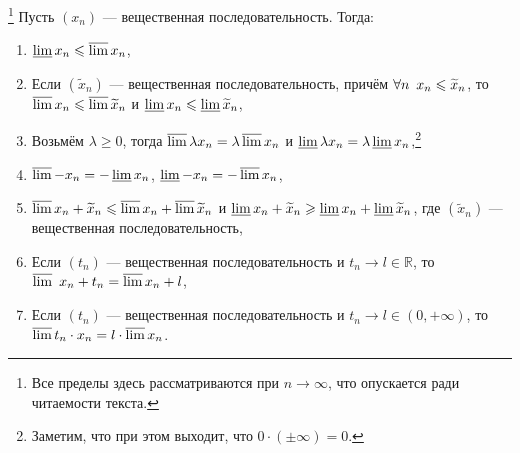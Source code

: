 \begin{theorem}\footnote{Все пределы здесь рассматриваются при \(n \to \infty\), что опускается ради читаемости текста.}
	Пусть \((x_n)\) --- вещественная последовательность. Тогда:
	\begin{enumerate}
		\item \(\varliminf x_n \leqslant \varlimsup x_n\),
		\item Если \((\widetilde{x}_n)\) --- вещественная последовательность, причём \(\forall n \enskip x_n \leqslant \widetilde{x}_n\), то \(\varlimsup x_n \leqslant \varlimsup \widetilde{x}_n\) и \(\varliminf x_n \leqslant \varliminf \widetilde{x}_n\),
		\item Возьмём \(\lambda \geqslant 0\), тогда \(\varlimsup \lambda x_n = \lambda \varlimsup x_n\) и \(\varliminf \lambda x_n = \lambda \varliminf x_n\),\footnote{Заметим, что при этом выходит, что \(0 \cdot (\pm \infty) = 0\).}
		\item \(\varlimsup -x_n = -\varliminf x_n\), \(\varliminf -x_n = -\varlimsup x_n\),
		\item \(\varlimsup x_n + \widetilde{x}_n \leqslant \varlimsup x_n + \varlimsup \widetilde{x}_n\) и \(\varliminf x_n + \widetilde{x}_n \geqslant \varliminf x_n + \varliminf \widetilde{x}_n\), где \((\widetilde{x}_n)\) --- вещественная последовательность,
		\item Если \((t_n)\) --- вещественная последовательность и \(t_n \to l \in \mathbb{R}\), то \(\varlimsup\ x_n + t_n = \varlimsup x_n + l\),
		\item Если \((t_n)\) --- вещественная последовательность и \(t_n \to l \in (0, +\infty)\), то \(\varlimsup t_n \cdot x_n = l \cdot \varlimsup x_n\).
	\end{enumerate}
\end{theorem}
